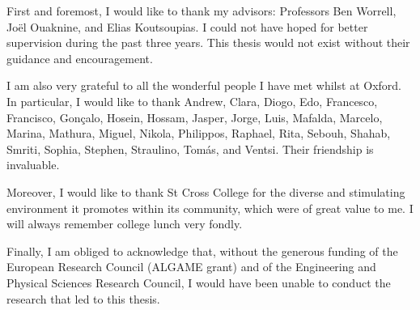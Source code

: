 \begin{acknowledgements}
First and foremost, I would like to thank my advisors: Professors Ben Worrell, Jo\"{e}l Ouaknine, and Elias Koutsoupias. I could not have hoped for better supervision during the past three years. This thesis would not exist without their guidance and encouragement.

I am also very grateful to all the wonderful people I have met whilst at Oxford. In particular, I would like to thank Andrew, Clara, Diogo, Edo, Francesco, Francisco, Gon\c{c}alo, Hosein, Hossam, Jasper, Jorge, Luis, Mafalda, Marcelo, Marina, Mathura, Miguel, Nikola, Philippos, Raphael, Rita, Sebouh, Shahab, Smriti, Sophia, Stephen, Straulino, Tom\'{a}s, and Ventsi. Their friendship is invaluable.

Moreover, I would like to thank St Cross College for the diverse and stimulating environment it promotes within its community, which were of great value to me. I will always remember college lunch very fondly.



Finally, I am obliged to acknowledge that, without the generous funding of the European Research Council (ALGAME grant) and of the Engineering and Physical Sciences Research Council, I would have been unable to conduct the research that led to this thesis.
\end{acknowledgements}
